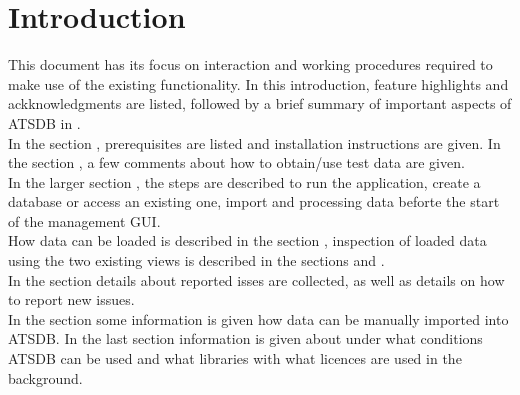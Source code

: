 \chapter{Introduction}

This document has its focus on interaction and working procedures required to make use of the existing
functionality. In this introduction, feature highlights and ackknowledgments are listed, followed by a brief summary of important aspects of  ATSDB in . \\

In the section , prerequisites are listed and installation instructions are given. In the section , a few comments about how to obtain/use test data are given. \\

In the larger section , the steps are described to run the application, create a database or access an existing one, import and processing data beforte the start of the management GUI. \\

How data can be loaded is described in the section , inspection of loaded data using the two existing views is described in the sections  and . \\

In the section  details about reported isses are collected, as well as details on how to report new issues. \\

In the section  some information is given how data can be manually imported into ATSDB. In the last section  information is given about under what conditions ATSDB can be used and what libraries with what licences are used in the background.













